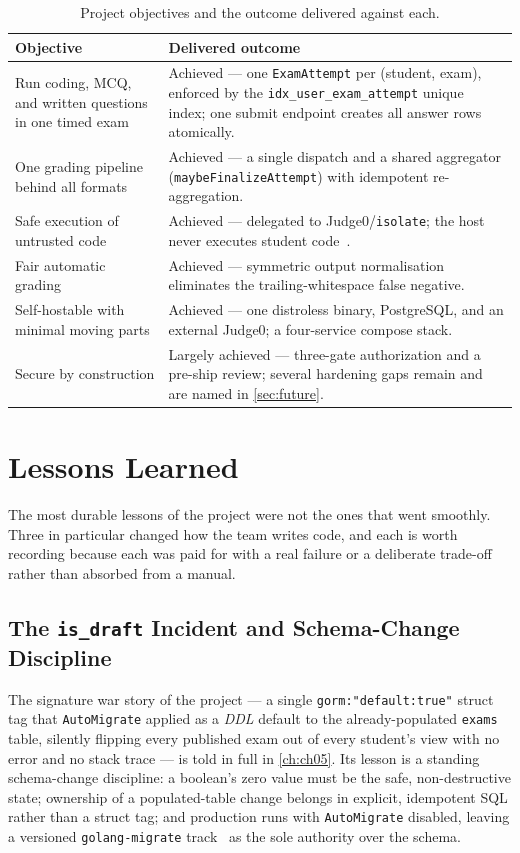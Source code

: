 \begin{table}[htbp]
\centering
\caption{Project objectives and the outcome delivered against each.}
\label{tab:objectives-review}
\begin{tabularx}{\linewidth}{@{}L{4.3cm}X@{}}
\toprule
\textbf{Objective} & \textbf{Delivered outcome} \\
\midrule
Run coding, MCQ, and written questions in one timed exam &
Achieved --- one \texttt{ExamAttempt} per (student, exam), enforced by the
\texttt{idx\_user\_exam\_attempt} unique index; one submit endpoint creates all
answer rows atomically. \\
One grading pipeline behind all formats &
Achieved --- a single dispatch and a shared aggregator
(\texttt{maybeFinalizeAttempt}) with idempotent re-aggregation. \\
Safe execution of untrusted code &
Achieved --- delegated to Judge0/\texttt{isolate}; the host never executes
student code~\cite{judge0}. \\
Fair automatic grading &
Achieved --- symmetric output normalisation eliminates the trailing-whitespace
false negative. \\
Self-hostable with minimal moving parts &
Achieved --- one distroless binary, PostgreSQL, and an external Judge0; a
four-service compose stack. \\
Secure by construction &
Largely achieved --- three-gate authorization and a pre-ship review; several
hardening gaps remain and are named in \cref{sec:future}. \\
\bottomrule
\end{tabularx}
\end{table}

\section{Lessons Learned}

The most durable lessons of the project were not the ones that went smoothly.
Three in particular changed how the team writes code, and each is worth
recording because each was paid for with a real failure or a deliberate
trade-off rather than absorbed from a manual.

\subsection{The \texttt{is\_draft} Incident and Schema-Change Discipline}

The signature war story of the project --- a single
\texttt{gorm:"default:true"} struct tag that \texttt{AutoMigrate} applied as a
\emph{DDL} default to the already-populated \texttt{exams} table, silently
flipping every published exam out of every student's view with no error and no
stack trace --- is told in full in \cref{ch:ch05}. Its lesson is a standing
schema-change discipline: a boolean's zero value must be the safe,
non-destructive state; ownership of a populated-table change belongs in
explicit, idempotent SQL rather than a struct tag; and production runs with
\texttt{AutoMigrate} disabled, leaving a versioned \texttt{golang-migrate}
track~\cite{golangmigrate} as the sole authority over the schema.

